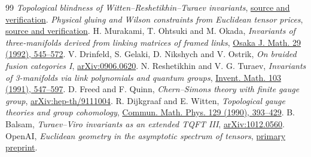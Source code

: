 \documentclass[11pt]{article}
\begin{document}
\begin{thebibliography}{99}
 \emph{Topological blindness of Witten--Reshetikhin--Turaev invariants}, \href{https://github.com/g3173028019-beep/ai-automated-quantum-gravity-research/tree/main/papers/50b-wrt-topological-blindness}{source and verification}.
 \emph{Physical gluing and Wilson constraints from Euclidean tensor prices}, \href{https://github.com/g3173028019-beep/ai-automated-quantum-gravity-research/tree/main/papers/41-tensor-prices-tv-fusion-and-wilson}{source and verification}.
 H. Murakami, T. Ohtsuki and M. Okada, \emph{Invariants of three-manifolds derived from linking matrices of framed links}, \href{https://doi.org/10.18910/4822}{Osaka J. Math. 29 (1992), 545--572}.
 V. Drinfeld, S. Gelaki, D. Nikshych and V. Ostrik, \emph{On braided fusion categories I}, \href{https://arxiv.org/abs/0906.0620}{arXiv:0906.0620}.
 N. Reshetikhin and V. G. Turaev, \emph{Invariants of 3-manifolds via link polynomials and quantum groups}, \href{https://doi.org/10.1007/BF02102060}{Invent. Math. 103 (1991), 547--597}.
 D. Freed and F. Quinn, \emph{Chern--Simons theory with finite gauge group}, \href{https://arxiv.org/abs/hep-th/9111004}{arXiv:hep-th/9111004}.
 R. Dijkgraaf and E. Witten, \emph{Topological gauge theories and group cohomology}, \href{https://doi.org/10.1007/BF02096988}{Commun. Math. Phys. 129 (1990), 393--429}.
 B. Balsam, \emph{Turaev--Viro invariants as an extended TQFT III}, \href{https://arxiv.org/abs/1012.0560}{arXiv:1012.0560}.
 OpenAI, \emph{Euclidean geometry in the asymptotic spectrum of tensors}, \href{https://github.com/openai/math/blob/main/preprints/Euclidean-geometry-in-the-asymptotic-spectrum-of-tensors-November-24-2026/README.md}{primary preprint}.
\end{thebibliography}
\end{document}
